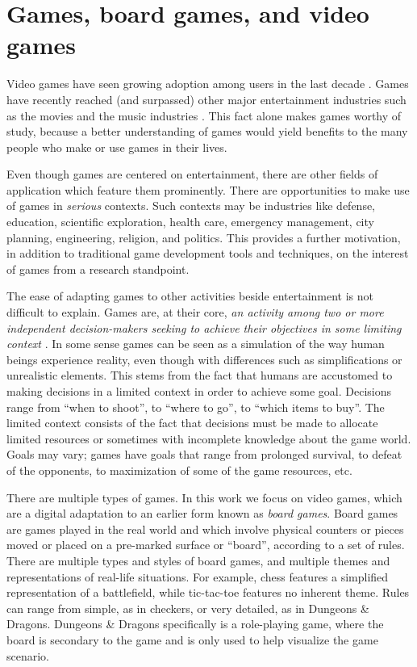 \section{Games, board games, and video games}

Video games have seen growing adoption among users in the last decade \cite{CHAPTER_1_GROWING_DIFFUSION}. Games have recently reached (and surpassed) other major entertainment industries such as the movies and the music industries \cite{CHAPTER_1_MOVIES_AND_MUSIC}. This fact alone makes games worthy of study, because a better understanding of games would yield benefits to the many people who make or use games in their lives.

Even though games are centered on entertainment, there are other fields of application which feature them prominently. There are opportunities to make use of games in \textit{serious} contexts. Such contexts may be industries like defense, education, scientific exploration, health care, emergency management, city planning, engineering, religion, and politics. This provides a further motivation, in addition to traditional game development tools and techniques, on the interest of games from a research standpoint.

The ease of adapting games to other activities beside entertainment is not difficult to explain. Games are, at their core, \textit{an activity among two or more independent decision-makers seeking to achieve their objectives in some limiting context} \cite{CHAPTER_1_DEFINITION_OF_GAME}. In some sense games can be seen as a simulation of the way human beings experience reality, even though with differences such as simplifications or unrealistic elements. This stems from the fact that humans are accustomed to making decisions in a limited context in order to achieve some goal. Decisions range from ``when to shoot'', to ``where to go'', to ``which items to buy''. The limited context consists of the fact that decisions must be made to allocate limited resources or sometimes with incomplete knowledge about the game world. Goals may vary; games have goals that range from prolonged survival, to defeat of the opponents, to maximization of some of the game resources, etc.

There are multiple types of games. In this work we focus on video games, which are a digital adaptation to an earlier form known as \textit{board games}. Board games are games played in the real world and which involve physical counters or pieces moved or placed on a pre-marked surface or ``board'', according to a set of rules. There are multiple types and styles of board games, and multiple themes and representations of real-life situations. For example, chess features a simplified representation of a battlefield, while tic-tac-toe features no inherent theme. Rules can range from simple, as in checkers, or very detailed, as in Dungeons \& Dragons. Dungeons \& Dragons specifically is a role-playing game, where the board is secondary to the game and is only used to help visualize the game scenario.

